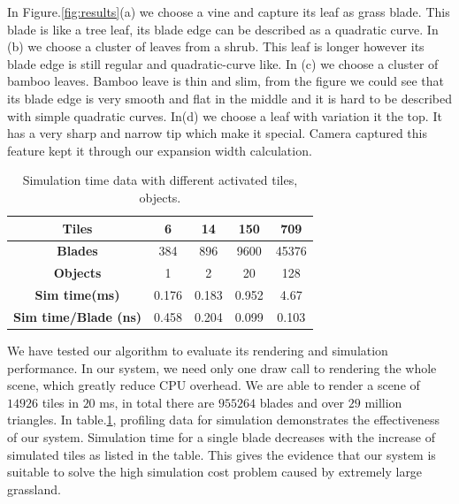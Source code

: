 \documentclass[10pt,journal,compsoc]{IEEEtran}
\begin{document}
In Figure.\ref{fig:results}(a) we choose a vine and capture its leaf as grass blade. This blade is like a tree leaf, its blade edge can be described as a quadratic curve. In (b) we choose a cluster of leaves from a shrub. This leaf is longer however its blade edge is still regular and quadratic-curve like. In (c) we choose a cluster of bamboo leaves. Bamboo leave is thin and slim, from the figure we could see that its blade edge is very smooth and flat in the middle and it is hard to be described with simple quadratic curves. In(d) we choose a leaf with variation it the top. It has a very sharp and narrow tip which make it special. Camera captured this feature kept it through our expansion width calculation.\\

\begin{table}[ht]
\begin{center}
 \begin{tabular}{|c|c|c|c|c|}
     \hline
     \textbf{Tiles} & 6 & 14 & 150 & 709 \\
     \hline
     \textbf{Blades}& 384 & 896 & 9600 & 45376 \\
     \hline
     \textbf{Objects} & 1 & 2 & 20 & 128 \\
     \hline
     \textbf{Sim time(ms)} & 0.176 & 0.183 & 0.952 & 4.67 \\
     \hline
     \textbf{Sim time/Blade (ns)} & 0.458 & 0.204 & 0.099 & 0.103 \\
     \hline
 \end{tabular}
 \caption{Simulation time data with different activated tiles, objects.}
 \label{table:frameprofile}
 \end{center}
 \end{table}

We have tested our algorithm to evaluate its rendering and simulation performance. In our system, we need only one draw call to rendering the whole scene, which greatly reduce CPU overhead. We are able to render a scene of $14926$ tiles in $20$ ms, in total there are $955264$ blades and over $29$ million triangles. In table.\ref{table:frameprofile}, profiling data for simulation demonstrates the effectiveness of our system. Simulation time for a single blade decreases with the increase of simulated tiles as listed in the table. This gives the evidence that our system is suitable to solve the high simulation cost problem caused by extremely large grassland.\\
\end{document}
